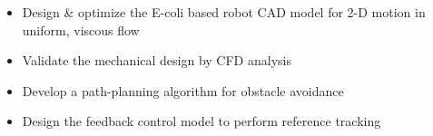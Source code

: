 \documentclass[letter,12pt]{article}
\begin{document}
\begin{itemize}[
    rightmargin=2cm
]
    \setlength{\itemsep}{1pt}
    \setlength{\parskip}{0pt}
    \setlength{\parsep}{0pt}
    \item{\small Design \& optimize the E-coli based robot CAD model for 2-D motion in uniform, viscous flow}
    \item{\small Validate the mechanical design by CFD analysis}
    \item{\small Develop a path-planning algorithm for obstacle avoidance}
    \item{\small Design the feedback control model to perform reference tracking}
    
\end{itemize}


\end{document}
